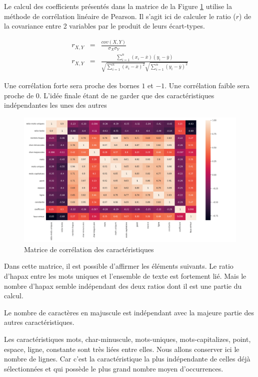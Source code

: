 			Le calcul des coefficients présentés dans la matrice de la Figure \ref{fig:corr} utilise la méthode de corrélation linéaire de Pearson.
			Il s'agit ici de calculer le ratio ($r$) de la covariance entre 2 variables par le produit de leurs écart-types.

			\begin{eqnarray*}
				r_{X,Y} &=& \frac{cov(X,Y)}{\sigma_{X}\sigma_{Y}}\\
				r_{X,Y} &=& \frac{\sum_{i=1}^{n}(x_{i}-\overline{x})(y_{i}-\overline{y})}{\sqrt{\sum_{i=1}^{n}(x_{i}-\overline{x})^{2}}\sqrt{\sum_{i=1}^{n}(y_{i}-\overline{y})^{2}}}
			\end{eqnarray*}

			Une corrélation forte sera proche des bornes $1$ et $-1$.
            Une corrélation faible sera proche de $0$.
            L'idée finale étant de ne garder que des caractéristiques indépendantes les unes des autres
            \begin{figure}[H]
				\includegraphics[width=\linewidth]{img/features_corr}
				\caption{Matrice de corrélation des caractéristiques}
				\label{fig:corr}
			\end{figure}

            Dans cette matrice, il est possible d'affirmer les éléments suivants.
            Le ratio d'hapax entre les mots uniques et l'ensemble de texte est fortement lié.
            Mais le nombre d'hapax semble indépendant des deux ratios dont il est une partie du calcul.

            Le nombre de caractères en majuscule est indépendant avec la majeure partie des autres caractéristiques.

            Les caractéristiques mots, char-minuscule, mots-uniques, mots-capitalizes, point, espace, ligne, constante sont très liées entre elles.
            Nous allons conserver ici le nombre de lignes.
            Car c'est la caractéristique la plus indépendante de celles déjà sélectionnées et qui possède le plus grand nombre moyen d'occurrences.

